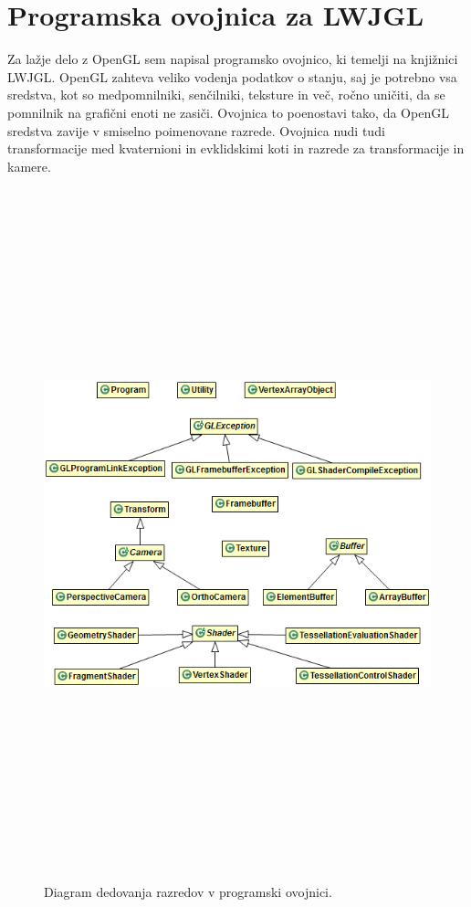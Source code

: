 \documentclass[a4paper, 12pt]{book}
\begin{document}
\section{Programska ovojnica za LWJGL}

Za lažje delo z OpenGL sem napisal programsko ovojnico, ki temelji na knjižnici LWJGL. OpenGL zahteva veliko vodenja podatkov o stanju, saj je potrebno vsa sredstva, kot so medpomnilniki, senčilniki, teksture in več, ročno uničiti, da se pomnilnik na grafični enoti ne zasiči. Ovojnica to poenostavi tako, da OpenGL sredstva zavije v smiselno poimenovane razrede. Ovojnica nudi tudi transformacije med kvaternioni in evklidskimi koti in razrede za transformacije in kamere.

\begin{figure}[h!]
\begin{center}
\includegraphics[width=16cm, height=20cm, keepaspectratio=true]{class_diagram.png}
\end{center}
\caption{Diagram dedovanja razredov v programski ovojnici.}
\label{classdiagram}
\end{figure}
\end{document}
